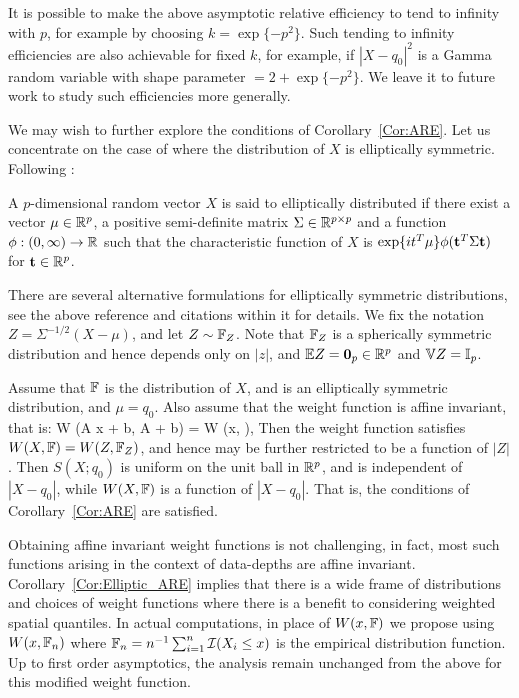 It is possible to make the above asymptotic relative efficiency to tend to infinity with 
$p$, for example by choosing $k = \exp\{- p^{2} \}$. Such tending to infinity efficiencies 
are also achievable for fixed $k$,  for example, if $|X - q_{0}|^{2}$ is a Gamma random 
variable with shape parameter $ = 2 + \exp\{- p^{2} \}$. We leave it to future work to 
study such efficiencies more generally. 

We may wish to further explore the conditions of Corollary~\ref{Cor:ARE}. 
Let us concentrate on the case of where the distribution of $X$ is 
elliptically symmetric. Following \cite{ref:Fangetal90_Book}:

\begin{Definition}
A $p$-dimensional random vector $X$ is said to elliptically distributed if 
there exist a vector $\mu \in {\mathbb{R}}^p$, a positive semi-definite matrix 
$\Sigma \in {\mathbb{R}}^{p \times p}$ and a function 
$\phi: (0, \infty) \rightarrow {\mathbb{R}}$ such that the characteristic function 
of $X$ is $\exp \{ i t^{T} \mu \} \phi ({\bf{t}}^T \Sigma {\bf{t}})$ for ${\bf{t}} \in {\mathbb{R}}^p$.
\end{Definition}

There are several alternative formulations for elliptically symmetric distributions, see the above reference and citations within it for details.  We fix the notation $Z = \Sigma^{-1/2} (X - \mu)$, and let $Z \sim {\mathbb{F}}_{Z}$. Note that ${\mathbb{F}}_{Z}$ is a spherically symmetric distribution and hence
depends only on $|z|$, and  ${\mathbb{E}} Z = \mathbf{0}_{p} \in {\mathbb{R}}^{p}$ and ${\mathbb{V}} Z = {\mathbb{I}}_{p}$.

\begin{Corollary}\label{Cor:Elliptic_ARE}
Assume that ${\mathbb{F}}$ is the distribution of $X$, and is an elliptically symmetric distribution, and $\mu = q_{0}$. Also assume that the weight function is affine invariant, that is:
\ban
W (A x + b, A \BF + b) = W (x, \BF),
\ean
Then  the weight function satisfies $W (X, {\mathbb{F}}) = W (Z, {\mathbb{F}}_{Z})$, and 
hence may be further restricted to be a function of $|Z|$. Then 
$S (X; q_{0})$ is uniform on the unit ball 
in ${\mathbb{R}}^{p}$, and is independent of $|X - q_{0}|$, while 
$W (X, {\mathbb{F}})$ is a function of  $|X - q_{0}|$. That is, the conditions of 
Corollary~\ref{Cor:ARE} are satisfied. 
\end{Corollary}

Obtaining affine invariant weight functions is not challenging, in fact, most 
such functions arising in the context of data-depths are affine invariant. 
Corollary~\ref{Cor:Elliptic_ARE} implies that there is a wide frame of distributions and 
choices of weight functions where there is a benefit to considering weighted spatial 
quantiles. In actual computations, in place of $W (x, {\mathbb{F}})$ we propose 
using $W (x, {\mathbb{F}}_{n})$ where 
${\mathbb{F}}_{n} = n^{-1} \sum_{i = 1}^{n} \mathcal{I} (X_{i} \leq x )$ is the empirical distribution 
function. Up to first order asymptotics, the analysis remain unchanged from the above 
for this modified weight function.

